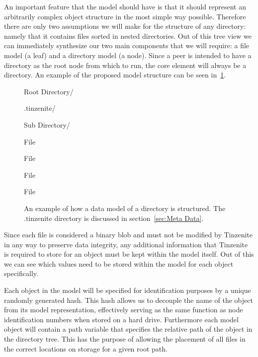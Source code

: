 An important feature that the model should have is that it should represent an arbitrarily complex object structure in the most simple way possible.
Therefore there are only two assumptions we will make for the structure of any directory: namely that it contains files sorted in nested directories.
Out of this tree view we can immediately synthesize our two main components that we will require: a file model (a leaf) and a directory model (a node).
Since a peer is intended to have a directory as the root node from which to run, the core element will always be a directory.
An example of the proposed model structure can be seen in~\ref{list:model}.

\begin{figure}[htp]
\begin{modellist}
\item Root Directory/
    \begin{modellist}
        \item .tinzenite/
        \item Sub Directory/
            \begin{modellist}
                \item File
                \item File
            \end{modellist}
        \item File
        \item File
    \end{modellist}
\end{modellist}
\caption[Data Model Example Structure]{An example of how a data model of a directory is structured. The .tinzenite directory is discussed in section~\ref{sec:Meta Data}.}
\label{list:model}
\end{figure}

Since each file is considered a binary blob and must not be modified by Tinzenite in any way to preserve data integrity, any additional information that Tinzenite is required to store for an object must be kept within the model itself.
Out of this we can see which values need to be stored within the model for each object specifically.

Each object in the model will be specified for identification purposes by a unique randomly generated hash.
This hash allows us to decouple the name of the object from its model representation, effectively serving as the same function as node identification numbers when stored on a hard drive.
Furthermore each model object will contain a path variable that specifies the relative path of the object in the directory tree.
This has the purpose of allowing the placement of all files in the correct locations on storage for a given root path.

